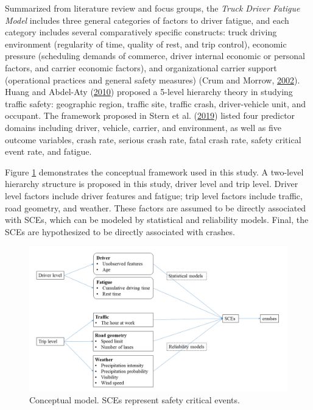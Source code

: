 \documentclass[12pt]{book}
\numberwithin{equation}{chapter}
\begin{document}
Summarized from literature review and focus groups, the \emph{Truck Driver Fatigue Model} includes three general categories of factors to driver fatigue, and each category includes several comparatively specific constructs: truck driving environment (regularity of time, quality of rest, and trip control), economic pressure (scheduling demands of commerce, driver internal economic or personal factors, and carrier economic factors), and organizational carrier support (operational practices and general safety measures) (Crum and Morrow, \protect\hyperlink{ref-crum2002influence}{2002}). Huang and Abdel-Aty (\protect\hyperlink{ref-huang2010multilevel}{2010}) proposed a 5-level hierarchy theory in studying traffic safety: geographic region, traffic site, traffic crash, driver-vehicle unit, and occupant. The framework proposed in Stern et al. (\protect\hyperlink{ref-stern2019data}{2019}) listed four predictor domains including driver, vehicle, carrier, and environment, as well as five outcome variables, crash rate, serious crash rate, fatal crash rate, safety critical event rate, and fatigue.

Figure \ref{fig:conceptmodel} demonstrates the conceptual framework used in this study. A two-level hierarchy structure is proposed in this study, driver level and trip level. Driver level factors include driver features and fatigue; trip level factors include traffic, road geometry, and weather. These factors are assumed to be directly associated with SCEs, which can be modeled by statistical and reliability models. Final, the SCEs are hypothesized to be directly associated with crashes.

\begin{figure}[!ht]

{\centering \includegraphics[width=\linewidth]{figs/conceptual_model} 

}

\caption{Conceptual model. SCEs represent safety critical events.}\label{fig:conceptmodel}
\end{figure}
\end{document}
